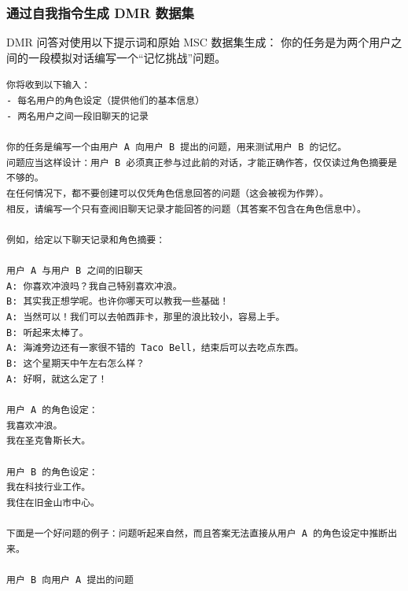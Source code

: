 \documentclass[UTF8,fontset=fandol,a4paper,11pt]{ctexart}
\begin{document}
\subsubsection{通过自我指令生成 DMR 数据集}
DMR 问答对使用以下提示词和原始 MSC 数据集生成：
你的任务是为两个用户之间的一段模拟对话编写一个“记忆挑战”问题。
\begin{mdframed}
\small
\texttt{你将收到以下输入：\\
- 每名用户的角色设定（提供他们的基本信息）\\
- 两名用户之间一段旧聊天的记录\\\\
你的任务是编写一个由用户 A 向用户 B 提出的问题，用来测试用户 B 的记忆。\\
问题应当这样设计：用户 B 必须真正参与过此前的对话，才能正确作答，仅仅读过角色摘要是不够的。\\
在任何情况下，都不要创建可以仅凭角色信息回答的问题（这会被视为作弊）。\\
相反，请编写一个只有查阅旧聊天记录才能回答的问题（其答案不包含在角色信息中）。\\\\
例如，给定以下聊天记录和角色摘要：\\\\
用户 A 与用户 B 之间的旧聊天\\
A: 你喜欢冲浪吗？我自己特别喜欢冲浪。\\
B: 其实我正想学呢。也许你哪天可以教我一些基础！\\
A: 当然可以！我们可以去帕西菲卡，那里的浪比较小，容易上手。\\
B: 听起来太棒了。\\
A: 海滩旁边还有一家很不错的 Taco Bell，结束后可以去吃点东西。\\
B: 这个星期天中午左右怎么样？\\
A: 好啊，就这么定了！\\\\
用户 A 的角色设定：\\
我喜欢冲浪。\\
我在圣克鲁斯长大。\\\\
用户 B 的角色设定：\\
我在科技行业工作。\\
我住在旧金山市中心。\\\\
下面是一个好问题的例子：问题听起来自然，而且答案无法直接从用户 A 的角色设定中推断出来。\\\\
用户 B 向用户 A 提出的问题\\
}
\end{mdframed}
\end{document}
